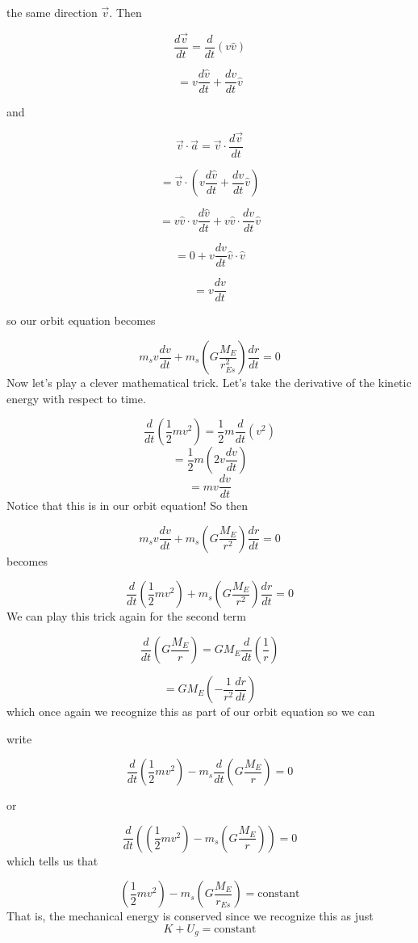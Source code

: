 the same direction $\overrightarrow{v}.$ Then 

$$\frac{d\overrightarrow{v}}{dt}=\frac{d}{dt}\left( v\hat{v}\right) $$

$$=v\frac{d\hat{v}}{dt}+\frac{dv}{dt}\hat{v}$$

and 

$$\overrightarrow{v}\cdot \overrightarrow{a}=\overrightarrow{v}\cdot \frac{d\overrightarrow{v}}{dt}$$

$$=\overrightarrow{v}\cdot \left( v\frac{d\hat{v}}{dt}+\frac{dv}{dt}\hat{v}\right)
$$

$$=v\hat{v}\cdot v\frac{d\hat{v}}{dt}+v\hat{v}\cdot \frac{dv}{dt}\hat{v}$$

$$=0+v\frac{dv}{dt}\hat{v}\cdot \hat{v}$$

$$=v\frac{dv}{dt}$$

so our orbit equation becomes

$$m_{s}v\frac{dv}{dt}+m_{s}\left( G\frac{M_{E}}{r_{Es}^{2}}\right) \frac{dr}{dt}=0
$$
Now let's play a clever mathematical trick. Let's take the derivative of the
kinetic energy with respect to time.

$$\frac{d}{dt}\left( \frac{1}{2}mv^{2}\right) =\frac{1}{2}m\frac{d}{dt}\left(v^{2}\right) 
$$%
$$=\frac{1}{2}m\left( 2v\frac{dv}{dt}\right) 
$$%
$$=mv\frac{dv}{dt}$$%
Notice that this is in our orbit equation! So then%

$$m_{s}v\frac{dv}{dt}+m_{s}\left( G\frac{M_{E}}{r^{2}}\right) \frac{dr}{dt}=0
$$%
becomes 

$$\frac{d}{dt}\left( \frac{1}{2}mv^{2}\right) +m_{s}\left( G\frac{M_{E}}{r^{2}}\right) \frac{dr}{dt}=0$$%
We can play this trick again for the second term%

$$
\frac{d}{dt}\left( G\frac{M_{E}}{r}\right) =GM_{E}\frac{d}{dt}\left( \frac{1}{r}\right) 
$$
	
$$
=GM_{E}\left( -\frac{1}{r^{2}}\frac{dr}{dt}\right) 
$$
which once again we recognize this as part of our orbit equation so we can

write 

$$\frac{d}{dt}\left( \frac{1}{2}mv^{2}\right) -m_{s}\frac{d}{dt}\left( G\frac{M_{E}}{r}\right) =0$$

or 

$$\frac{d}{dt}\left( \left( \frac{1}{2}mv^{2}\right) -m_{s}\left( G\frac{M_{E}}{r}\right) \right) =0 
$$%
which tells us that 

$$
\left( \frac{1}{2}mv^{2}\right) -m_{s}\left( G\frac{M_{E}}{r_{Es}}\right) =\text{constant} 
$$
That is, the mechanical energy is conserved since we recognize this as just 
$$K+U_{g}=\text{constant} $$

